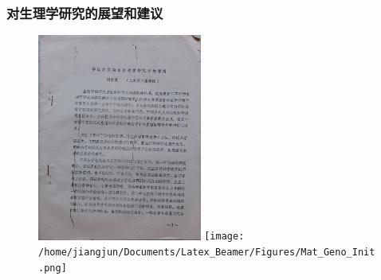 \frame
{
	\frametitle{对生理学研究的展望和建议}
	{\fontsize{6.2pt}{4.2pt}}
\begin{figure}[h!] 
\centering
\vspace{-0.08in}
\includegraphics[height=0.60\textwidth,width=0.48\textwidth,clip]{Figures_Peking-Opera/Liu-Paper.jpg}
\texttt{[image: /home/jiangjun/Documents/Latex\_Beamer/Figures/Mat\_Geno\_Init.png]}
\label{Liu-Paper}
\end{figure}
}

